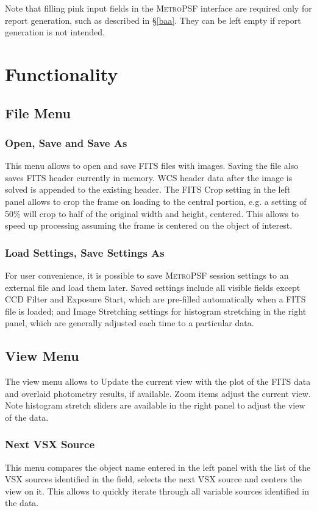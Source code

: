 \documentclass{article}
\begin{document}
Note that filling pink input fields in the \textsc{MetroPSF} interface are required only for report generation, such as described in \S \ref{baa}. They can be left empty if report generation is not intended.

\section{Functionality} \label{functionality}
\subsection{File Menu}
\subsubsection{Open, Save and Save As}
This menu allows to open and save FITS files with images. Saving the file also saves FITS header currently in memory. WCS header data after the image is solved is appended to the existing header. The FITS Crop setting in the left panel allows to crop the frame on loading to the central portion, e.g. a setting of 50\% will crop to half of the original width and height, centered. This allows to speed up processing assuming the frame is centered on the object of interest.
\subsubsection{Load Settings, Save Settings As}
For user convenience, it is possible to save \textsc{MetroPSF} session settings to an external file and load them later. Saved settings include all visible fields except CCD Filter and Exposure Start, which are pre-filled automatically when a FITS file is loaded; and Image Stretching settings for histogram stretching in the right panel, which are generally adjusted each time to a particular data. 
\subsection{View Menu}
The view menu allows to Update the current view with the plot of the FITS data and overlaid photometry results, if available. Zoom items adjust the current view. Note histogram stretch sliders are available in the right panel to adjust the view of the data.
\subsubsection{Next VSX Source}
This menu compares the object name entered in the left panel with the list of the VSX sources identified in the field, selects the next VSX source and centers the view on it. This allows to quickly iterate through all variable sources identified in the data.
\end{document}
